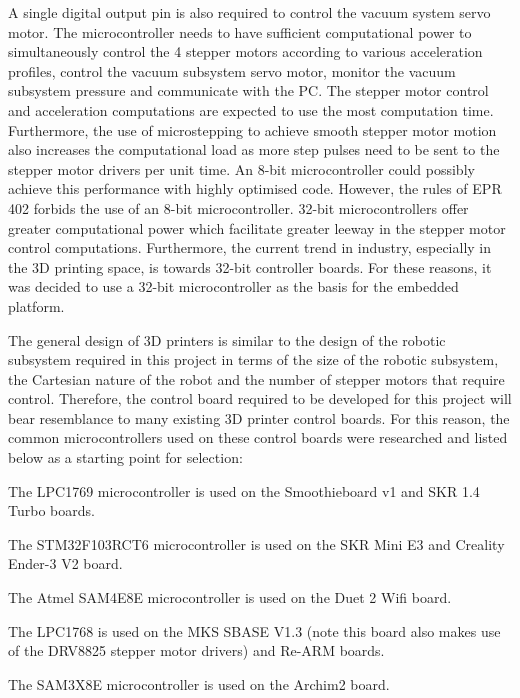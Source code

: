 A single digital output pin is also required to control the vacuum system servo motor. The microcontroller needs to have sufficient computational power to simultaneously control the 4 stepper motors according to various acceleration profiles, control the vacuum subsystem servo motor, monitor the vacuum subsystem pressure and communicate with the PC. The stepper motor control and acceleration computations are expected to use the most computation time. Furthermore, the use of microstepping to achieve smooth stepper motor motion also increases the computational load as more step pulses need to be sent to the stepper motor drivers per unit time. An 8-bit microcontroller could possibly achieve this performance with highly optimised code. However, the rules of EPR 402 forbids the use of an 8-bit microcontroller. 32-bit microcontrollers offer greater computational power which facilitate greater leeway in the stepper motor control computations. Furthermore, the current trend in industry, especially in the 3D printing space, is towards 32-bit controller boards. For these reasons, it was decided to use a 32-bit microcontroller as the basis for the embedded platform.

The general design of 3D printers is similar to the design of the robotic subsystem required in this project in terms of the size of the robotic subsystem, the Cartesian nature of the robot and the number of stepper motors that require control. Therefore, the control board required to be developed for this project will bear resemblance to many existing 3D printer control boards. For this reason, the common microcontrollers used on these control boards were researched and listed below as a starting point for selection:

\begin{compactitem}
	\item The LPC1769 microcontroller is used on the Smoothieboard v1 and SKR 1.4 Turbo boards.
	\item The STM32F103RCT6 microcontroller is used on the SKR Mini E3 and Creality Ender-3 V2 board.
	\item The Atmel SAM4E8E microcontroller is used on the Duet 2 Wifi board.
	\item The LPC1768 is used on the MKS SBASE V1.3 (note this board also makes use of the DRV8825 stepper motor drivers) and Re-ARM boards.
	\item The SAM3X8E microcontroller is used on the Archim2 board.
\end{compactitem}

